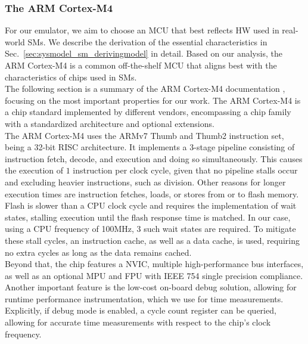 \documentclass[english]{tudscrartcl}
\begin{document}
			\subsubsection{The ARM Cortex-M4}
				\label{sec:bg_mcu_cm4}
				For our emulator, we aim to choose an \ac{MCU} that best reflects \ac{HW} used in real-world \acp{SM}.
				We describe the derivation of the essential characteristics in Sec.~\ref{sec:sysmodel_sm_derivingmodel} in detail.
				Based on our analysis, the ARM Cortex-M4 is a common off-the-shelf \ac{MCU} that aligns best with the characteristics of chips used in \acp{SM}.
				\\
				The following section is a summary of the ARM Cortex-M4 documentation \cite{ARMCM4DOC}, focusing on the most important properties for our work.
				The ARM Cortex-M4 is a chip standard implemented by different vendors, encompassing a chip family with a standardized architecture and optional extensions.
				\\
				The ARM Cortex-M4 uses the ARMv7 Thumb and Thumb2 instruction set, being a 32-bit RISC architecture.
				It implements a 3-stage pipeline consisting of instruction fetch, decode, and execution and doing so simultaneously.
				This causes the execution of $1$ instruction per clock cycle, given that no pipeline stalls occur and excluding heavier instructions, such as division.
				Other reasons for longer execution times are instruction fetches, loads, or stores from or to flash memory.
				Flash is slower than a \ac{CPU} clock cycle and requires the implementation of wait states, stalling execution until the flash response time is matched.
				In our case, using a \ac{CPU} frequency of 100MHz, 3 such wait states are required.
				To mitigate these stall cycles, an instruction cache, as well as a data cache, is used, requiring no extra cycles as long as the data remains cached.
				\\
				Beyond that, the chip features a \ac{NVIC}, multiple high-performance bus interfaces, as well as an optional \ac{MPU} and \ac{FPU} with IEEE 754 single precision compliance.
				Another important feature is the low-cost on-board debug solution, allowing for runtime performance instrumentation, which we use for time measurements.
				Explicitly, if debug mode is enabled, a cycle count register can be queried, allowing for accurate time measurements with respect to the chip's clock frequency.
				\\
\end{document}
